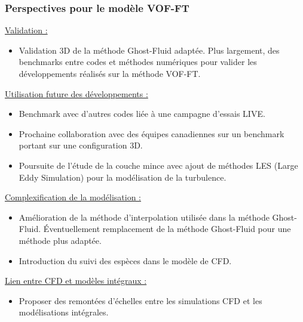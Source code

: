 \documentclass{beamer}
\begin{document}
\begin{frame}
    \frametitle{Perspectives pour le modèle VOF-FT}
    \scriptsize
        \color{cea_rouge}\underline{Validation :} \color{cea_texte}
         \begin{itemize}
        	
        	  	
        	\item  Validation 3D de la méthode Ghost-Fluid adaptée. Plus largement, des benchmarks entre codes et méthodes numériques pour valider les développements réalisés sur la méthode VOF-FT. 
        	        	\end{itemize}
        	        	\color{cea_rouge}\underline{Utilisation future des développements :} \color{cea_texte}
        \begin{itemize}
        	\item Benchmark avec d'autres codes liée à une campagne d'essais LIVE.
        	\item Prochaine collaboration avec des équipes canadiennes sur un benchmark portant sur une configuration 3D.
        	\item Poursuite de l'étude de la couche mince avec ajout de méthodes LES (Large Eddy Simulation) pour la modélisation de la turbulence.
        	
        	\end{itemize}
        	\color{cea_rouge}\underline{Complexification de la modélisation :} \color{cea_texte}
        	\begin{itemize}
            
            \item Amélioration de la méthode d'interpolation utilisée dans la méthode Ghost-Fluid. Éventuellement remplacement de la méthode Ghost-Fluid pour une méthode plus adaptée.
            \item Introduction du suivi des espèces dans le modèle de CFD.
            
           
            \end{itemize}
        	\color{cea_rouge}\underline{Lien entre CFD et modèles intégraux :} \color{cea_texte}
        	\begin{itemize}
            
           
            \item Proposer des remontées d'échelles entre les simulations CFD et les modélisations intégrales.
            
            
        \end{itemize}

\end{frame}
\end{document}
